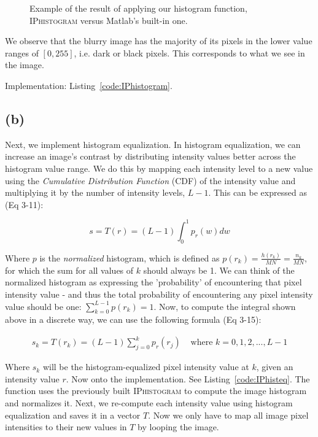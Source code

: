 \documentclass{article}
\begin{document}
\begin{figure}[ht]
    \centering
    
    \caption{Example of the result of applying our histogram function, \textsc{IPhistogram} versus Matlab's built-in one.}
    \label{fig:histogram}
\end{figure}

We observe that the blurry image has the majority of its pixels in the lower value ranges of $[0, 255]$, i.e. dark or black pixels. This corresponds to what we see in the image.

 Implementation: Listing~\ref{code:IPhistogram}.

\subsection*{(b)} Next, we implement histogram equalization. In histogram equalization, we can increase an image's contrast by distributing intensity values better across the histogram value range. We do this by mapping each intensity level to a new value using the \textit{Cumulative Distribution Function} (CDF) of the intensity value and multiplying it by the number of intensity levels, $L - 1$. This can be expressed as (Eq 3-11):

\[
s=T(r)=(L-1)\int_{0}^{1} p_r(w)dw
\]

Where $p$ is the \textit{normalized} histogram, which is defined as $p(r_k)=\frac{h(r_k)}{MN}=\frac{n_k}{MN}$, for which the sum for all values of $k$ should always be 1. We can think of the normalized histogram as expressing the 'probability' of encountering that pixel intensity value - and thus the total probability of encountering any pixel intensity value should be one: $\sum_{k=0}^{L-1}p(r_k)=1$. Now, to compute the integral shown above in a discrete way, we can use the following formula (Eq 3-15):

\[
\begin{aligned}
s_k=T(r_k)=(L-1)\sum_{j=0}^{k}p_r(r_j) & \text{ where $k=0,1,2,...,L-1$}
\end{aligned}
\]

Where $s_k$ will be the histogram-equalized pixel intensity value at $k$, given an intensity value $r$. Now onto the implementation. See  Listing~\ref{code:IPhisteq}. The function uses the previously built \textsc{IPhistogram} to compute the image histogram and normalizes it. Next, we re-compute each intensity value using histogram equalization and saves it in a vector $T$. Now we only have to map all image pixel intensities to their new values in $T$ by looping the image.
\end{document}
